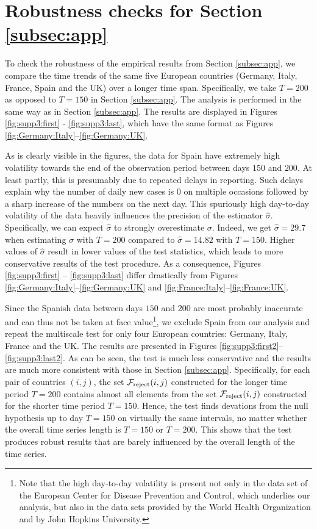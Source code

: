 \documentclass[a4paper,12pt]{article}
\numberwithin{equation}{section}
\begin{document}
\clearpage
{\color{red}
\section{Robustness checks for Section \ref{subsec:app}}
\label{s:subsec:app:3}


To check the robustness of the empirical results from Section \ref{subsec:app}, we compare the time trends of the same five European countries (Germany, Italy, France, Spain and the UK) over a longer time span. Specifically, we take $T=200$ as opposed to $T = 150$ in Section \ref{subsec:app}. The analysis is performed in the same way as in Section \ref{subsec:app}. The results are displayed in Figures \ref{fig:supp3:first} - \ref{fig:supp3:last},  which have the same format as Figures \ref{fig:Germany:Italy}--\ref{fig:Germany:UK}. 

As is clearly visible in the figures, the data for Spain have extremely high volatility towards the end of the observation period between days $150$ and $200$. At least partly, this is presumably due to repeated delays in reporting. Such delays explain why the number of daily new cases is $0$ on multiple occasions followed by a sharp increase of the numbers on the next day. This spuriously high day-to-day volatility of the data heavily influences the precision of the estimator $\hat{\sigma}$. Specifically, we can expect $\hat{\sigma}$ to strongly overestimate $\sigma$. Indeed, we get {\color{blue}$\hat{\sigma} = 29.7$} when estimating $\sigma$ with $T=200$ compared to $\hat{\sigma} = 14.82$ with $T = 150$. Higher values of $\hat{\sigma}$ result in lower values of the test statistics, which leads to more conservative results of the test procedure. As a consequence, Figures \ref{fig:supp3:first} -- \ref{fig:supp3:last} differ drastically from Figures \ref{fig:Germany:Italy}--\ref{fig:Germany:UK} and \ref{fig:France:Italy}--\ref{fig:France:UK}. 

Since the Spanish data between days $150$ and $200$ are most probably inaccurate and can thus not be taken at face value\footnote{Note that the high day-to-day volatility is present not only in the data set of the European Center for Disease Prevention and Control, which underlies our analysis, but also in the data sets provided by the World Health Organization and by John Hopkins University.}, we exclude Spain from our analysis and repeat the multiscale test for only four European countries: Germany, Italy, France and the UK. The results are presented in Figures \ref{fig:supp3:first2}--\ref{fig:supp3:last2}. As can be seen, the test is much less conservative and the results are much more consistent with those in Section \ref{subsec:app}. Specifically, for each pair of countries $(i, j)$, the set $\mathcal{F}_{\text{reject}}(i, j)$ constructed for the longer time period $T = 200$ contains almost all elements from the set $\mathcal{F}_{\text{reject}}(i, j)$ constructed for the shorter time period $T = 150$. Hence, the test finds devations from the null hypothesis up to day $T=150$ on virtually the same intervals, no matter whether the overall time series length is $T=150$ or $T=200$. This shows that the test produces robust results that are barely influenced by the overall length of the time series. 

}
\end{document}
